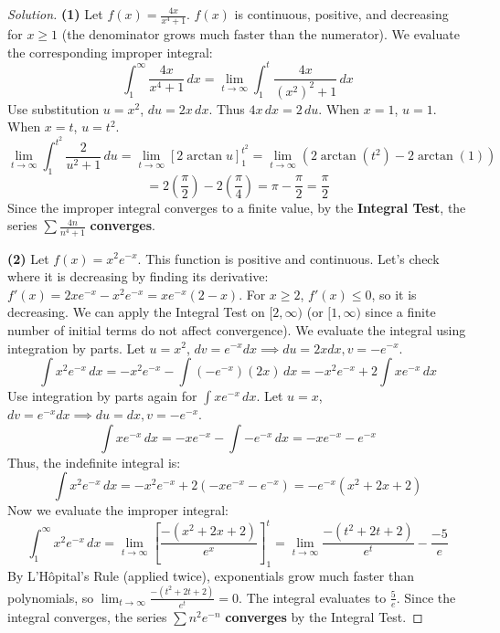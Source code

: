 \documentclass[11pt]{article}
\theoremstyle{definition}
\newenvironment{solution}{\begin{proof}[Solution]}{\end{proof}}
\begin{document}
\begin{solution}
\textbf{(1)} Let $f(x) = \frac{4x}{x^4+1}$. $f(x)$ is continuous, positive, and decreasing for $x \ge 1$ (the denominator grows much faster than the numerator). We evaluate the corresponding improper integral:
\[
\int_1^\infty \frac{4x}{x^4+1} \,dx = \lim_{t \to \infty} \int_1^t \frac{4x}{(x^2)^2+1} \,dx
\]
Use substitution $u = x^2$, $du = 2x \,dx$. Thus $4x \,dx = 2 \,du$.
When $x=1$, $u=1$. When $x=t$, $u=t^2$.
\[
\lim_{t \to \infty} \int_1^{t^2} \frac{2}{u^2+1} \,du = \lim_{t \to \infty} \left[ 2\arctan u \right]_1^{t^2} = \lim_{t \to \infty} \left( 2\arctan(t^2) - 2\arctan(1) \right)
\]
\[
= 2\left(\frac{\pi}{2}\right) - 2\left(\frac{\pi}{4}\right) = \pi - \frac{\pi}{2} = \frac{\pi}{2}
\]
Since the improper integral converges to a finite value, by the \textbf{Integral Test}, the series $\sum \frac{4n}{n^4+1}$ \textbf{converges}.

\textbf{(2)} Let $f(x) = x^2 e^{-x}$. This function is positive and continuous. Let's check where it is decreasing by finding its derivative:
$f'(x) = 2xe^{-x} - x^2 e^{-x} = xe^{-x}(2-x)$. For $x \ge 2$, $f'(x) \le 0$, so it is decreasing. We can apply the Integral Test on $[2, \infty)$ (or $[1, \infty)$ since a finite number of initial terms do not affect convergence).
We evaluate the integral using integration by parts. Let $u=x^2$, $dv=e^{-x}dx \implies du=2x dx, v=-e^{-x}$.
\[
\int x^2 e^{-x} \,dx = -x^2 e^{-x} - \int (-e^{-x})(2x) \,dx = -x^2 e^{-x} + 2 \int x e^{-x} \,dx
\]
Use integration by parts again for $\int x e^{-x} \,dx$. Let $u=x$, $dv=e^{-x}dx \implies du=dx, v=-e^{-x}$.
\[
\int x e^{-x} \,dx = -x e^{-x} - \int -e^{-x} \,dx = -x e^{-x} - e^{-x}
\]
Thus, the indefinite integral is:
\[
\int x^2 e^{-x} \,dx = -x^2 e^{-x} + 2(-x e^{-x} - e^{-x}) = -e^{-x}(x^2 + 2x + 2)
\]
Now we evaluate the improper integral:
\[
\int_1^\infty x^2 e^{-x} \,dx = \lim_{t \to \infty} \left[ \frac{-(x^2 + 2x + 2)}{e^x} \right]_1^t = \lim_{t \to \infty} \frac{-(t^2 + 2t + 2)}{e^t} - \frac{-5}{e}
\]
By L'Hôpital's Rule (applied twice), exponentials grow much faster than polynomials, so $\lim_{t \to \infty} \frac{-(t^2 + 2t + 2)}{e^t} = 0$.
The integral evaluates to $\frac{5}{e}$. Since the integral converges, the series $\sum n^2 e^{-n}$ \textbf{converges} by the Integral Test.


\end{solution}
\end{document}
